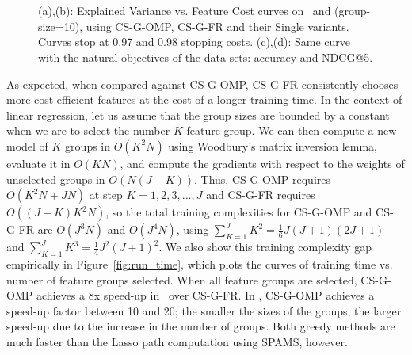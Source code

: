 

\begin{figure}
\centering
{}
~

~

\caption{(a),(b): Explained Variance vs. Feature Cost curves on 
\Grain\, and \YahooLTR (group-size=10), 
using CS-G-OMP, CS-G-FR and their Single variants. Curves stop at 0.97 and 0.98 stopping costs. (c),(d): Same curve with the natural objectives of the data-sets: accuracy and NDCG@5.} 
\label{fig:selection_methods}
\end{figure}

As expected, when compared against CS-G-OMP, CS-G-FR consistently chooses more cost-efficient features at the cost of a longer training time.
In the context of linear regression, let us assume that the group sizes are 
bounded by a constant when we are to select the number 
$K$ feature group. We can then compute a new model of $K$  groups in $O(K^2N)$ using
Woodbury's matrix inversion lemma, evaluate it in $O(KN)$, and compute the gradients with respect to the weights of unselected groups in $O(N(J-K))$. Thus, CS-G-OMP requires $O(K^2N + JN)$ at step $K=1,2,3,..., J$ and CS-G-FR requires $O((J-K)K^2N)$, so the total training  complexities for CS-G-OMP and CS-G-FR are $O(J^3N)$ and $O(J^4N)$, using $\sum_{K=1}^J K^2 = \frac{1}{6}J(J+1)(2J+1)$ and $\sum _{K=1}^J K^3 = \frac{1}{4}J^2(J+1)^2$. 
We also show this training complexity gap empirically in Figure~\ref{fig:run_time}, which plots the curves of training time vs. number of feature groups selected. When all feature groups are selected, CS-G-OMP achieves a 8x speed-up in \Grain\ over CS-G-FR. In \YahooLTR, CS-G-OMP achieves a speed-up factor between 10 and 20; the smaller the sizes of the groups, the larger speed-up due to the increase in the number of groups. Both greedy methods are much faster than the Lasso path computation using SPAMS, however. 


